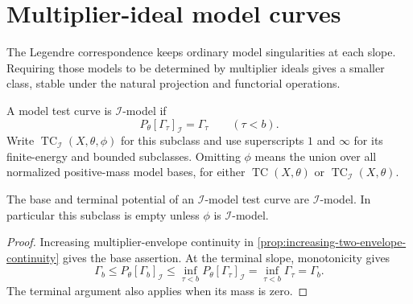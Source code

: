 \section{Multiplier-ideal model curves}
\label{sec:i-model-test-curves}
The Legendre correspondence keeps ordinary model singularities at each slope. Requiring those models to be determined by multiplier ideals gives a smaller class, stable under the natural projection and functorial operations.

\begin{definition}\label{def:i-model-test-curve}
A model test curve is $\mathcal I$-model if
\[
 P_\theta[\Gamma_\tau]_{\mathcal I}=\Gamma_\tau
                                      \qquad(\tau<b).
\]
Write $\operatorname{TC}_{\mathcal I}(X,\theta,\phi)$ for this subclass and use superscripts $1$ and $\infty$ for its finite-energy and bounded subclasses.
Omitting $\phi$ means the union over all normalized positive-mass model bases, for either $\operatorname{TC}(X,\theta)$ or $\operatorname{TC}_{\mathcal I}(X,\theta)$.
\end{definition}

\begin{proposition}\label{prop:i-model-test-curve-boundaries}
The base and terminal potential of an $\mathcal I$-model test curve are $\mathcal I$-model. In particular this subclass is empty unless $\phi$ is $\mathcal I$-model.
\end{proposition}
\begin{proof}
Increasing multiplier-envelope continuity in \cref{prop:increasing-two-envelope-continuity} gives the base assertion. At the terminal slope, monotonicity gives
\[
 \Gamma_b\leq P_\theta[\Gamma_b]_{\mathcal I}
       \leq\inf_{\tau<b}P_\theta[\Gamma_\tau]_{\mathcal I}
       =\inf_{\tau<b}\Gamma_\tau=\Gamma_b.
\]
The terminal argument also applies when its mass is zero.
\end{proof}

